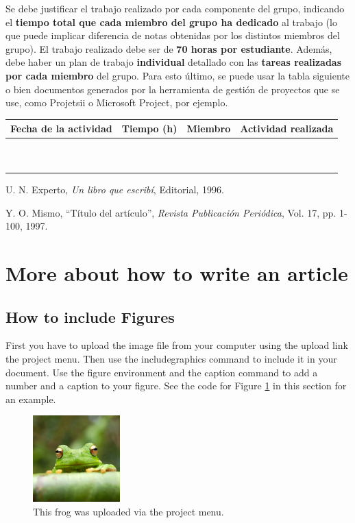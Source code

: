 \documentclass[a4paper]{article}
\begin{document}
Se debe justificar el trabajo realizado por cada componente del grupo, indicando el {\bf tiempo total que cada miembro del grupo ha dedicado} al trabajo (lo que puede implicar diferencia de notas obtenidas por los distintos miembros del grupo). El trabajo realizado debe ser de {\bf 70 horas por estudiante}. Además, debe haber un plan de trabajo \textbf{individual} detallado con las {\bf tareas realizadas por cada miembro} del grupo. Para esto último, se puede usar la tabla siguiente o bien documentos generados por la herramienta de gestión de proyectos que se use, como Projetsii o Microsoft Project, por ejemplo.

\begin{center}
\begin{tabular}{|c|c|c|c|}
\hline
 Fecha de la
 actividad 
& Tiempo (h)
& Miembro
& Actividad realizada
\\\hline
\mbox{ }&\mbox{}&\mbox{ }&\mbox{}\\
\mbox{ }&\mbox{}&\mbox{ }&\mbox{}\\\hline
\end{tabular}
\end{center}


\begin{thebibliography}{10}



U. N. Experto, \emph{Un libro que escribí},
Editorial, 1996.

Y. O. Mismo,
``Título del artículo'',
\emph{Revista Publicación Periódica}, Vol. 17, pp. 1-100, 1997.
\end{thebibliography}

\newpage 

\section*{More about how to write an article}
\subsection{How to include Figures}

First you have to upload the image file from your computer using the upload link the project menu. Then use the includegraphics command to include it in your document. Use the figure environment and the caption command to add a number and a caption to your figure. See the code for Figure \ref{fig:frog} in this section for an example.

\begin{figure}[h]
\centering
\includegraphics[width=0.3\textwidth]{frog.jpg}
\caption{\label{fig:frog}This frog was uploaded via the project menu.}
\end{figure}
\end{document}
